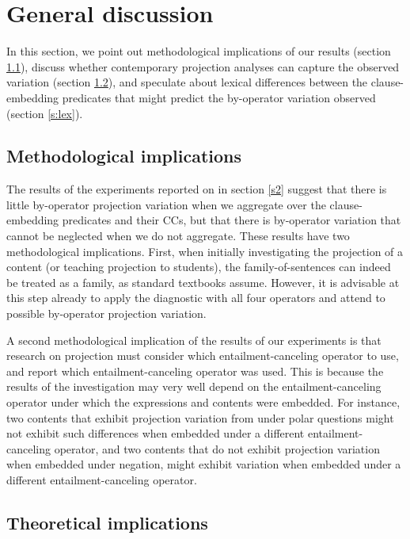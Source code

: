 \documentclass[a4paper,12pt,twoside]{article}
\begin{document}
\section{General discussion}\label{s:general}

    In this section, we point out methodological implications of our results (section \ref{s:method-impl}), discuss whether contemporary projection analyses can capture the observed variation (section \ref{s:analysis}), and speculate about lexical differences between the clause-embedding predicates that might predict the by-operator variation observed (section \ref{s:lex}).

\subsection{Methodological implications}\label{s:method-impl}

The results of the experiments reported on in section \ref{s2} suggest that there is little by-operator projection variation when we aggregate over the clause-embedding predicates and their CCs, but that there is by-operator variation that cannot be neglected when we do not aggregate. These results have two methodological implications. First, when initially investigating the projection of a content (or teaching projection to students), the family-of-sentences can indeed be treated as a family, as standard textbooks assume. However, it is advisable at this step already to apply the diagnostic with all four operators and attend to possible by-operator projection variation. 

A second methodological implication of the results of our experiments is that research on projection must consider which entailment-canceling operator to use, and report which entailment-canceling operator was used. This is because the results of the investigation may very well depend on the entailment-canceling operator under which the expressions and contents were embedded. For instance, two contents that exhibit projection variation from under polar questions might not exhibit such differences when embedded under a different entailment-canceling operator, and two contents that do not exhibit projection variation when embedded under negation, might exhibit variation when embedded under a different entailment-canceling operator.

\subsection{Theoretical implications}\label{s:analysis}
\end{document}
